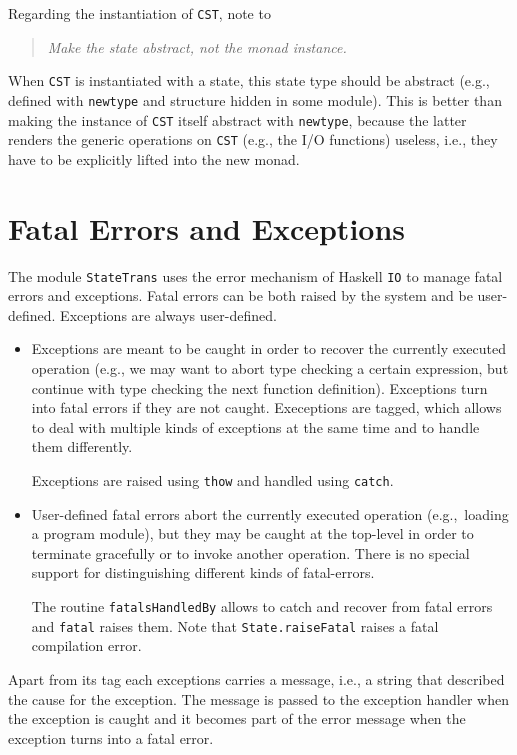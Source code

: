 \documentclass{report}
\newcommand{\code}[1]{\texttt{#1}}
\begin{document}
Regarding the instantiation of \code{CST}, note to
%
\begin{quote}\itshape
  Make the state abstract, not the monad instance.
\end{quote}
%
When \code{CST} is instantiated with a state, this state type should be
abstract (e.g., defined with \code{newtype} and structure hidden in some
module).  This is better than making the instance of \code{CST} itself
abstract with \code{newtype}, because the latter renders the generic
operations on \code{CST} (e.g., the I/O functions) useless, i.e., they have to 
be explicitly lifted into the new monad.


\section{Fatal Errors and Exceptions}
\label{sec:fatal}

The module \code{StateTrans} uses the error mechanism of Haskell \code{IO} to
manage fatal errors and exceptions. Fatal errors can be both raised by the
system and be user-defined. Exceptions are always user-defined.
%
\begin{itemize}

\item Exceptions are meant to be caught in order to recover the currently
  executed operation (e.g., we may want to abort type checking a certain
  expression, but continue with type checking the next function definition).
  Exceptions turn into fatal errors if they are not caught. Execeptions are
  tagged, which allows to deal with multiple kinds of exceptions at the same
  time and to handle them differently.

  Exceptions are raised using \code{thow} and handled using \code{catch}.

\item User-defined fatal errors abort the currently executed operation (e.g.,\
  loading a program module), but they may be caught at the top-level in order
  to terminate gracefully or to invoke another operation. There is no special
  support for distinguishing different kinds of fatal-errors.

  The routine \code{fatalsHandledBy} allows to catch and recover from fatal
  errors and \code{fatal} raises them. Note that \code{State.raiseFatal} raises
  a fatal compilation error.

\end{itemize}
%
Apart from its tag each exceptions carries a message, i.e., a string that
described the cause for the exception. The message is passed to the exception
handler when the exception is caught and it becomes part of the error message
when the exception turns into a fatal error.
\end{document}
